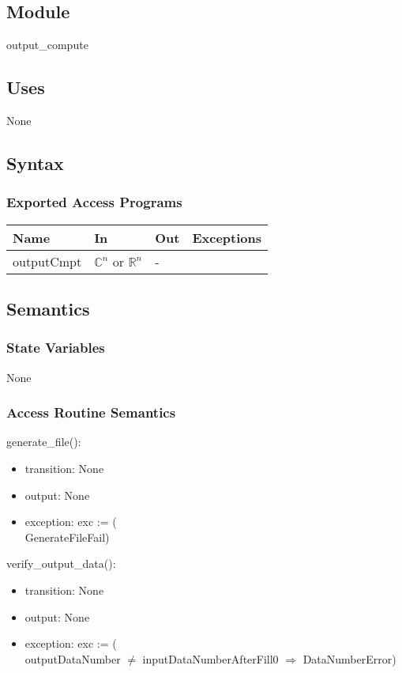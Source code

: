 \documentclass[12pt, titlepage]{article}
\begin{document}
\subsection{Module}

output\_compute

\subsection{Uses}
None
\subsection{Syntax}

\subsubsection{Exported Access Programs}

\begin{center}
\begin{tabular}{p{2cm} p{4cm} p{4cm} p{2cm}}
\hline
\textbf{Name} & \textbf{In} & \textbf{Out} & \textbf{Exceptions} \\
\hline
outputCmpt & $\mathbb{C}^ n$ or $\mathbb{R}^ n$& - & \\

\hline
\end{tabular}
\end{center}

\subsection{Semantics}

\subsubsection{State Variables}
None


\subsubsection{Access Routine Semantics}

generate\_file():

\begin{itemize}
\item transition: None
\item output:  None
\item exception: exc := (\\
GenerateFileFail)
\end{itemize}
verify\_output\_data():
\begin{itemize}
\item transition: None
\item output:  None
\item exception: exc := (\\
outputDataNumber $\neq$ inputDataNumberAfterFill0 $\Rightarrow$ DataNumberError)
\end{itemize}
\end{document}
